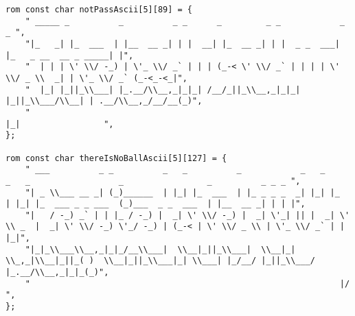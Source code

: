 \begin{lstlisting}
rom const char notPassAscii[5][89] = {
	" _____ _          _          _ _      _         _ _            _                      _ ",
	"|_   _| |_  ___  | |__  __ _| | |  __| |_  __ _| | |  _ _  ___| |_   _ __  __ _ _____| |",
	"  | | | \' \\/ -_) | \'_ \\/ _` | | | (_-< \' \\/ _` | | | | \' \\/ _ \\  _| | \'_ \\/ _` (_-<_-<_|",
	"  |_| |_||_\\___| |_.__/\\__,_|_|_| /__/_||_\\__,_|_|_| |_||_\\___/\\__| | .__/\\__,_/__/__(_)",
	"                                                                    |_|                 ",
};

rom const char thereIsNoBallAscii[5][127] = {
	" ___          _ _          _   _          _            _   _        _   _                  _                 _          _ _ _ ",
	"| _ \\___ __ _| (_)______  | |_| |_  ___  | |_ _ _ _  _| |_| |_     | |_| |_  ___ _ _ ___  (_)___  _ _  ___  | |__  __ _| | | |",
	"|   / -_) _` | | |_ / -_) |  _| \' \\/ -_) |  _| \'_| || |  _| \' \\ _  |  _| \' \\/ -_) \'_/ -_) | (_-< | \' \\/ _ \\ | \'_ \\/ _` | | |_|",
	"|_|_\\___\\__,_|_|_/__\\___|  \\__|_||_\\___|  \\__|_|  \\_,_|\\__|_||_( )  \\__|_||_\\___|_| \\___| |_/__/ |_||_\\___/ |_.__/\\__,_|_|_(_)",
	"                                                               |/                                                             ",
};


\end{lstlisting}
